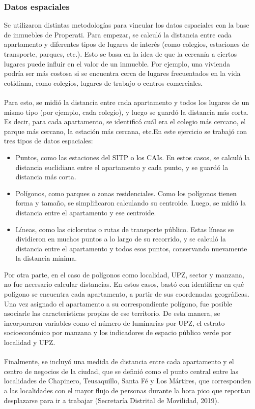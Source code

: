 \documentclass[article,11 pt]{article}
\begin{document}
\subsubsection{Datos espaciales}

Se utilizaron distintas metodologías para vincular los datos espaciales con la base de inmuebles de Properati. Para empezar, se calculó la distancia entre cada apartamento y diferentes tipos de lugares de interés (como colegios, estaciones de transporte, parques, etc.). Esto se basa en la idea de que la cercanía a ciertos lugares puede influir en el valor de un inmueble. Por ejemplo, una vivienda podría ser más costosa si se encuentra cerca de lugares frecuentados en la vida cotidiana, como colegios, lugares de trabajo o centros comerciales.
\\
\\
Para esto, se midió la distancia entre cada apartamento y todos los lugares de un mismo tipo (por ejemplo, cada colegio), y luego se guardó la distancia más corta. Es decir, para cada apartamento, se identificó cuál era el colegio más cercano, el parque más cercano, la estación más cercana, etc.En este ejercicio se trabajó con tres tipos de datos espaciales:

\begin{itemize}
    \item Puntos, como las estaciones del SITP o los CAIs. En estos casos, se calculó la distancia euclidiana entre el apartamento y cada punto, y se guardó la distancia más corta.

    \item Polígonos, como parques o zonas residenciales. Como los polígonos tienen forma y tamaño, se simplificaron calculando su centroide. Luego, se midió la distancia entre el apartamento y ese centroide.

    \item Líneas, como las ciclorutas o rutas de transporte público. Estas líneas se dividieron en muchos puntos a lo largo de su recorrido, y se calculó la distancia entre el apartamento y todos esos puntos, conservando nuevamente la distancia mínima.

\end{itemize}

Por otra parte, en el caso de polígonos como localidad, UPZ, sector y manzana, no fue necesario calcular distancias. En estos casos, bastó con identificar en qué polígono se encuentra cada apartamento, a partir de sus coordenadas geográficas. Una vez asignado el apartamento a su correspondiente polígono, fue posible asociarle las características propias de ese territorio. De esta manera, se incorporaron variables como el número de luminarias por UPZ, el estrato socioeconómico por manzana y los indicadores de espacio público verde por localidad y UPZ.
\\
\\
Finalmente, se incluyó una medida de distancia entre cada apartamento y el centro de negocios de la ciudad, que se definió como el punto central entre las localidades de Chapinero, Teusaquillo, Santa Fé y Los Mártires, que corresponden a las localidades con el mayor flujo de personas durante la hora pico que reportan desplazarse para ir a trabajar (Secretaría Distrital de Movilidad, 2019).
\end{document}
